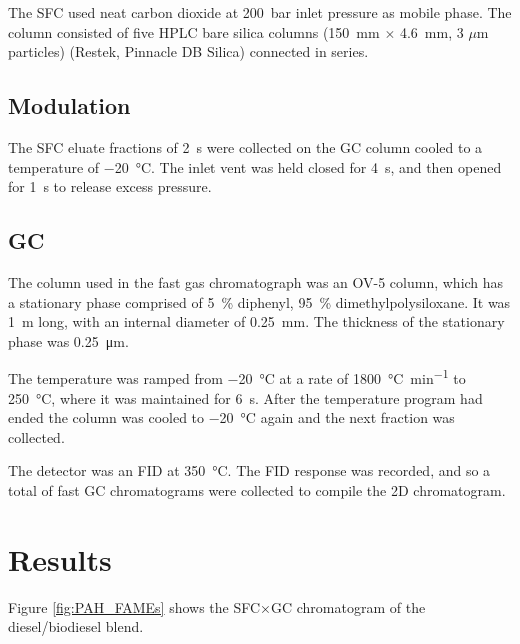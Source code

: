 The SFC used neat carbon dioxide at \SI{200}{\bar} inlet pressure as mobile
phase. The column consisted of five HPLC bare silica columns
(\SI{150}{\milli\metre} $\times$ \SI{4.6}{\milli\metre}, 3 $\mu$m particles)
(Restek, Pinnacle DB Silica) connected in series.

\subsection{Modulation}


The SFC eluate fractions of \SI{2}{\second} were collected on the GC column
cooled to a temperature of \SI{-20}{\celsius}. The inlet vent was held closed
for \SI{4}{\second}, and then opened for \SI{1}{\second} to release excess
pressure.


\subsection{GC}

The column used in the fast gas chromatograph was an OV-5 column, which has a
stationary phase comprised of \SI{5}{\percent} diphenyl, \SI{95}{\percent}
dimethylpolysiloxane. It was \SI{1}{\metre} long, with an internal diameter of
\SI{0.25}{\milli\metre}. The thickness of the stationary phase was
\SI{0.25}{\micro\metre}.

The temperature was ramped from \SI{-20}{\celsius} at a rate of
\SI{1800}{\celsius\per\minute} to \SI{250}{\celsius}, where it was maintained
for \SI{6}{s}. After the temperature program had ended the column was cooled to
\SI{-20}{\celsius} again and the next fraction was collected.

The detector was an FID at \SI{350}{\celsius}. The FID response was recorded,
and so a total of  fast GC chromatograms were collected to compile the 2D
chromatogram.

\section{Results}

Figure \ref{fig:PAH_FAMEs} shows the SFC×GC chromatogram of the diesel/biodiesel blend.

